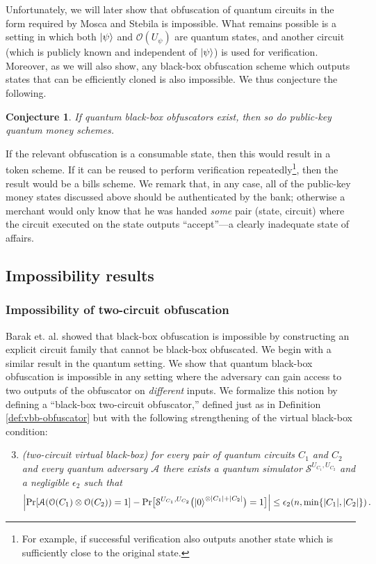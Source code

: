 \documentclass[11pt]{article}
\numberwithin{equation}{section}
\newtheorem{conjecture}{Conjecture}
\begin{document}
{Unfortunately, we will later show that obfuscation of quantum circuits in the form required by Mosca and Stebila is impossible. What remains possible is a setting in which both ${\left\vert{\psi}\right\rangle}$ and $\mathcal O(U_\psi)$ are quantum states, and another circuit (which is publicly known and independent of ${\left\vert{\psi}\right\rangle}$) is used for verification. Moreover, as we will also show, any black-box obfuscation scheme which outputs states that can be efficiently cloned is also impossible. We thus conjecture the following.
\begin{conjecture}
If quantum black-box obfuscators exist, then so do public-key quantum money schemes.
\end{conjecture}
If the relevant obfuscation is a consumable state, then this would result in a token scheme. If it can be reused to perform verification repeatedly\footnote{For example, if successful verification also outputs another state which is sufficiently close to the original state.}, then the result would be a bills scheme. We remark that, in any case, all of the public-key money states discussed above should be authenticated by the bank; otherwise a merchant would only know that he was handed \emph{some} pair (state, circuit) where the circuit executed on the state outputs ``accept''---a clearly inadequate state of affairs.

\subsection{Impossibility results}\label{vbb:impossibility}

\subsubsection{Impossibility of two-circuit obfuscation}\label{sec-twocircuit}
Barak et. al. \cite{BGIRSVY12} showed that black-box obfuscation is impossible by constructing an explicit circuit family that cannot be black-box obfuscated. 
We begin with a similar result in the quantum setting. We show that quantum black-box obfuscation is impossible in any setting where the adversary can gain access to two outputs of the obfuscator on \emph{different} inputs. We formalize this notion by defining a ``black-box two-circuit obfuscator,''  defined just as in Definition \ref{def:vbb-obfuscator} but with the following strengthening of the virtual black-box condition:
\begin{enumerate}
\setcounter{enumi}{2}
\item \emph{(two-circuit virtual black-box) for every pair of quantum circuits $C_1$ and $C_2$ and every quantum adversary $\mathcal A$ there exists a quantum simulator $\mathcal S^{U_{C_1}, U_{C_2}}$ and a negligible $\epsilon_2$ such that}
$$
\Bigl| \text{Pr}[\mathcal A(\mathcal O(C_1) \otimes \mathcal O(C_2)) = 1] - \text{Pr}\bigl[\mathcal S^{U_{C_1}, U_{C_2}}\bigl({\left\vert{0}\right\rangle}^{\otimes |C_1| + |C_2|}\bigr) = 1\bigr] \Bigr| \leq \epsilon_2(n, \min\{|C_1|,|C_2|\})\,.
$$
\end{enumerate}

}
\end{document}
